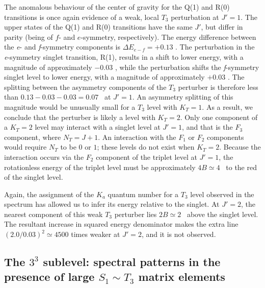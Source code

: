 \documentclass[12pt]{mitthesis}
\begin{document}
The anomalous behaviour of the center of gravity for the Q(1) and R(0)
transitions is once again evidence of a weak, local $T_3$ perturbation
at $J'=1$.  The upper states of the Q(1) and R(0) transitions have the
same $J'$, but differ in parity (being of $f$- and $e$-symmetry,
respectively).  The energy difference between the \emph{e}- and
\emph{f}-symmetry components is $\Delta E_{e-f}=+0.13$ \rcm.  The
perturbation in the \emph{e}-symmetry singlet transition, R(1),
results in a shift to lower energy, with a magnitude of approximately
$-0.03$ \rcm, while the perturbation shifts the \emph{f}-symmetry
singlet level to lower energy, with a magnitude of approximately
$+0.03$ \rcm.  The splitting between the asymmetry components of the
$T_3$ perturber is therefore less than $0.13-0.03-0.03=0.07$ \rcm\ at
$J'=1$.  An asymmetry splitting of this magnitude would be unusually
small for a $T_3$ level with $K_T=1$.  As a result, we conclude that
the perturber is likely a level with $K_T=2$.  Only one component of a
$K_T=2$ level may interact with a singlet level at $J'=1$, and that is
the $F_3$ component, where $N_T=J+1$.  An interaction with the $F_1$
or $F_2$ components would require $N_T$ to be $0$ or $1$; these levels
do not exist when $K_T=2$.  Because the interaction occurs via the
$F_2$ component of the triplet level at $J'=1$, the rotationless
energy of the triplet level must be approximately $4B \simeq 4$ \rcm\
to the red of the singlet level.

Again, the assignment of the $K_a$ quantum number for a $T_3$ level
observed in the spectrum has allowed us to infer its energy relative
to the singlet.  At $J'=2$, the nearest component of this weak $T_3$
perturber lies $2B \simeq 2$ \rcm\ above the singlet level.  The
resultant increase in squared energy denominator makes the
extra line $(2.0/0.03)^2 \simeq 4500$ times weaker at $J'=2$, and it
is not observed.

%
% 











\subsection{The $3^3$  sublevel: spectral patterns in the
  presence of large $S_1 \sim T_3$ matrix elements}
\end{document}
